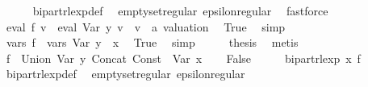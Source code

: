\begin{isabellebody}
\ \ \ \ \isamarkupfalse%
\ bipart{\isacharunderscore}{\kern0pt}rlexp{\isacharunderscore}{\kern0pt}def\ \isamarkupfalse%
\ emptyset{\isacharunderscore}{\kern0pt}regular\ epsilon{\isacharunderscore}{\kern0pt}regular\ \isamarkupfalse%
\ fastforce\isanewline
\ \ \isamarkupfalse%
\ \isamarkupfalse%
\ {\isachardoublequoteopen}eval\ {\isacharquery}{\kern0pt}f{\isacharprime}{\kern0pt}\ v\ {\isacharequal}{\kern0pt}\ eval\ {\isacharparenleft}{\kern0pt}Var\ y{\isacharparenright}{\kern0pt}\ v{\isachardoublequoteclose}\ \ v\ {\isacharcolon}{\kern0pt}{\isacharcolon}{\kern0pt}\ {\isachardoublequoteopen}{\isacharprime}{\kern0pt}a\ valuation{\isachardoublequoteclose}\ \isamarkupfalse%
\ True\ \isamarkupfalse%
\ simp\isanewline
\ \ \isamarkupfalse%
\ \isamarkupfalse%
\ {\isachardoublequoteopen}vars\ {\isacharquery}{\kern0pt}f{\isacharprime}{\kern0pt}\ {\isacharequal}{\kern0pt}\ vars\ {\isacharparenleft}{\kern0pt}Var\ y{\isacharparenright}{\kern0pt}\ {\isasymunion}\ {\isacharbraceleft}{\kern0pt}x{\isacharbraceright}{\kern0pt}{\isachardoublequoteclose}\ \isamarkupfalse%
\ True\ \isamarkupfalse%
\ simp\isanewline
\ \ \isamarkupfalse%
\ \isamarkupfalse%
\ {\isacharquery}{\kern0pt}thesis\ \isamarkupfalse%
\ metis\isanewline
{}\isamarkupfalse%
\isanewline
\ \ \isamarkupfalse%
\ {\isacharquery}{\kern0pt}f{\isacharprime}{\kern0pt}\ {\isacharequal}{\kern0pt}\ {\isachardoublequoteopen}Union\ {\isacharparenleft}{\kern0pt}Var\ y{\isacharparenright}{\kern0pt}\ {\isacharparenleft}{\kern0pt}Concat\ {\isacharparenleft}{\kern0pt}Const\ {\isacharbraceleft}{\kern0pt}{\isacharbraceright}{\kern0pt}{\isacharparenright}{\kern0pt}\ {\isacharparenleft}{\kern0pt}Var\ x{\isacharparenright}{\kern0pt}{\isacharparenright}{\kern0pt}{\isachardoublequoteclose}\isanewline
\ \ \isamarkupfalse%
\ False\isanewline
\ \ \isamarkupfalse%
\ \isamarkupfalse%
\ {\isachardoublequoteopen}bipart{\isacharunderscore}{\kern0pt}rlexp\ x\ {\isacharquery}{\kern0pt}f{\isacharprime}{\kern0pt}{\isachardoublequoteclose}\isanewline
\ \ \ \ \isamarkupfalse%
\ bipart{\isacharunderscore}{\kern0pt}rlexp{\isacharunderscore}{\kern0pt}def\ \isamarkupfalse%
\ emptyset{\isacharunderscore}{\kern0pt}regular\ epsilon{\isacharunderscore}{\kern0pt}regular\ \isamarkupfalse%

\end{isabellebody}
